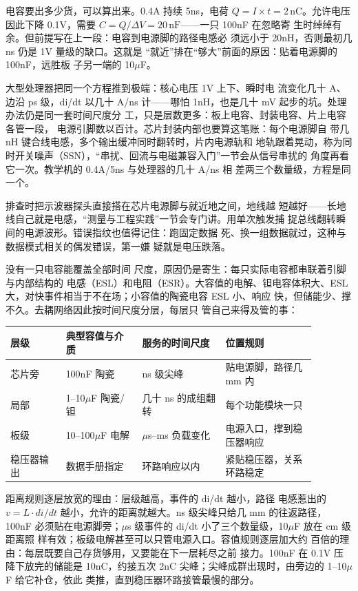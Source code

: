 电容要出多少货，可以算出来。0.4A 持续 5ns，电荷 $Q = I
\times t = 2\,\mathrm{nC}$。允许电压因此下降 0.1V，需要
$C = Q/\Delta V = 20\,\mathrm{nF}$——一只 100nF 在忽略寄
生时绰绰有余。但前提写在上一段：电容到电源脚的路径电感必
须远小于 20nH，否则最初几 ns 仍是 1V 量级的缺口。这就是
“就近”排在“够大”前面的原因：贴着电源脚的 100nF，远胜板
子另一端的 10$\mu$F。

大型处理器把同一个方程推到极端：核心电压 1V 上下、瞬时电
流变化几十 A、边沿 ps 级，di/dt 以几十 A/ns 计——哪怕
1nH，也是几十 mV 起步的坑。处理办法仍是同一套时间尺度分
工，只是层数更多：板上电容、封装电容、片上电容各管一段，
电源引脚数以百计。芯片封装内部也要算这笔账：每个电源脚自
带几 nH 键合线电感，多个输出缓冲同时翻转时，片内电源轨和
地轨跟着晃动，称为同时开关噪声（SSN），“串扰、回流与电磁兼容入门”一节会从信号串扰的
角度再看它一次。教学机的 0.4A/5ns 与处理器的几十 A/ns 相
差两三个数量级，方程是同一个。

排查时把示波器探头直接搭在芯片电源脚与就近地之间，地线越
短越好——长地线自己就是电感，“测量与工程实践”一节会专门讲。用单次触发捕
捉总线翻转瞬间的电源波形。错误指纹也值得记住：跑固定数据
死、换一组数据就过，这种与数据模式相关的偶发错误，第一嫌
疑就是电压跌落。

没有一只电容能覆盖全部时间
尺度，原因仍是寄生：每只实际电容都串联着引脚与内部结构的
电感（ESL）和电阻（ESR）。大容值的电解、钽电容体积大、ESL
大，对快事件相当于不在场；小容值的陶瓷电容 ESL 小、响应
快，但储能少、撑不久。去耦网络因此按时间尺度分层，每层只
管自己来得及管的事：

\begin{longtable}{L{0.16\linewidth}L{0.22\linewidth}L{0.24\linewidth}L{0.26\linewidth}}
\toprule
层级 & 典型容值与介质 & 服务的时间尺度 & 位置规则 \\
\midrule
芯片旁 & 100nF 陶瓷 & ns 级尖峰 & 贴电源脚，路径几 mm 内 \\\tablerowrule
局部 & 1--10$\mu$F 陶瓷/钽 & 几十 ns 的成组翻转 & 每个功能模块一只 \\\tablerowrule
板级 & 10--100$\mu$F 电解 & $\mu$s--ms 负载变化 & 电源入口，撑到稳压器响应 \\\tablerowrule
稳压器输出 & 数据手册指定 & 环路响应以内 & 紧贴稳压器，关系环路稳定 \\
\bottomrule
\end{longtable}

距离规则逐层放宽的理由：层级越高，事件的 di/dt 越小，路径
电感惹出的 $v = L \cdot di/dt$ 越小，允许的距离就越大。ns
级尖峰只给几 mm 的往返路径，100nF 必须贴在电源脚旁；$\mu$s
级事件的 di/dt 小了三个数量级，10$\mu$F 放在 cm 级距离照
样有效；板级电解甚至可以只管电源入口。容值规则逐层加大约
百倍的理由：每层既要自己存货够用，又要能在下一层耗尽之前
接力。100nF 在 0.1V 压降下放完的储能是 10nC，约接五次 2nC
尖峰；尖峰成群出现时，由旁边的 1--10$\mu$F 给它补仓，依此
类推，直到稳压器环路接管最慢的部分。

